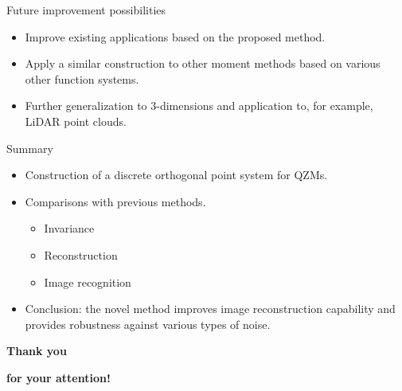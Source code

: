 \documentclass{beamer}
\begin{document}
\begin{frame}{Future improvement possibilities}
    \begin{itemize}
    \item Improve existing applications based on the proposed method.
    \item Apply a similar construction to other moment methods based on various other function systems.
    \item Further generalization to 3-dimensions and application to, for example, LiDAR point clouds.
    \end{itemize}
\end{frame}

\begin{frame}{Summary}
    \begin{itemize}
    \item Construction of a discrete orthogonal point system for QZMs.
    \item Comparisons with previous methods.
        \begin{itemize}
        \item Invariance
        \item Reconstruction
        \item Image recognition
        \end{itemize}
    \item Conclusion: the novel method improves image reconstruction capability and provides robustness against various types of noise.
    \end{itemize}
\end{frame}


{
%
\begin{frame}{}

\textbf{\huge\color{white} Thank you}

\bigskip

\textbf{\huge\color{white} for your attention!}

\end{frame}
}
\end{document}

